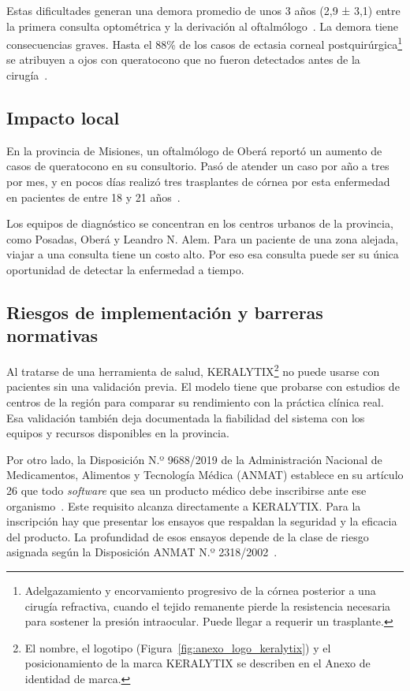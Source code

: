         Estas dificultades generan una demora promedio de unos 3 años (2,9 ± 3,1) entre la primera consulta optométrica y la derivación al oftalmólogo~\cite{demora_diagnostica}. La demora tiene consecuencias graves. Hasta el 88\% de los casos de ectasia corneal postquirúrgica\footnote{Adelgazamiento y encorvamiento progresivo de la córnea posterior a una cirugía refractiva, cuando el tejido remanente pierde la resistencia necesaria para sostener la presión intraocular. Puede llegar a requerir un trasplante.} se atribuyen a ojos con queratocono que no fueron detectados antes de la cirugía~\cite{falsos_negativos_ectasia}.

    \subsection*{Impacto local}

        En la provincia de Misiones, un oftalmólogo de Oberá reportó un aumento de casos de queratocono en su consultorio. Pasó de atender un caso por año a tres por mes, y en pocos días realizó tres trasplantes de córnea por esta enfermedad en pacientes de entre 18 y 21 años~\cite{misiones}.

        Los equipos de diagnóstico se concentran en los centros urbanos de la provincia, como Posadas, Oberá y Leandro N. Alem. Para un paciente de una zona alejada, viajar a una consulta tiene un costo alto. Por eso esa consulta puede ser su única oportunidad de detectar la enfermedad a tiempo.

    \subsection*{Riesgos de implementación y barreras normativas}
    \label{sec:riesgos}

        Al tratarse de una herramienta de salud, KERALYTIX\footnote{El nombre, el logotipo (Figura~\ref{fig:anexo_logo_keralytix}) y el posicionamiento de la marca KERALYTIX se describen en el Anexo de identidad de marca.} no puede usarse con pacientes sin una validación previa. El modelo tiene que probarse con estudios de centros de la región para comparar su rendimiento con la práctica clínica real. Esa validación también deja documentada la fiabilidad del sistema con los equipos y recursos disponibles en la provincia.

        Por otro lado, la Disposición N.º 9688/2019 de la Administración Nacional de Medicamentos, Alimentos y Tecnología Médica (ANMAT) establece en su artículo 26 que todo \textit{software} que sea un producto médico debe inscribirse ante ese organismo~\cite{dispo_9688}. Este requisito alcanza directamente a KERALYTIX. Para la inscripción hay que presentar los ensayos que respaldan la seguridad y la eficacia del producto. La profundidad de esos ensayos depende de la clase de riesgo asignada según la Disposición ANMAT N.º 2318/2002~\cite{dispo_2318}.

